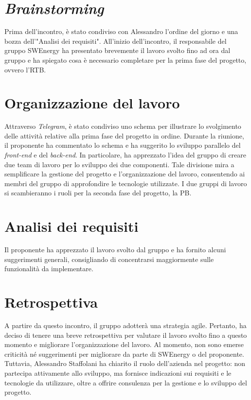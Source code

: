 \section{\textit{Brainstorming}}

Prima dell'incontro, è stato condiviso con Alessandro l'ordine del giorno e 
una bozza dell'"Analisi dei requisiti". All'inizio dell'incontro, il 
responsabile del gruppo SWEnergy ha presentato brevemente il lavoro svolto 
fino ad ora dal gruppo e ha spiegato cosa è necessario completare per la prima 
fase del progetto, ovvero l'RTB.

\section{Organizzazione del lavoro}

Attraverso \textit{Telegram}, è stato condiviso uno schema per illustrare lo 
svolgimento delle attività relative alla prima fase del progetto in ordine. 
Durante la riunione, il proponente ha commentato lo schema e ha suggerito lo 
sviluppo parallelo del \textit{front-end} e del \textit{back-end}. In 
particolare, ha apprezzato l'idea del gruppo di creare due team di lavoro per lo 
sviluppo dei due componenti. Tale divisione mira a semplificare la gestione del 
progetto e l'organizzazione del lavoro, consentendo ai membri del gruppo di 
approfondire le tecnologie utilizzate. I due gruppi di lavoro si scambieranno 
i ruoli per la seconda fase del progetto, la PB.

\section{Analisi dei requisiti}

Il proponente ha apprezzato il lavoro svolto dal gruppo e ha fornito alcuni 
suggerimenti generali, consigliando di concentrarsi maggiormente sulle 
funzionalità da implementare.

\section{Retrospettiva}

A partire da questo incontro, il gruppo adotterà una strategia agile. Pertanto, 
ha deciso di tenere una breve retrospettiva per valutare il lavoro svolto fino a 
questo momento e migliorare l'organizzazione del lavoro. Al momento, non sono 
emerse criticità né suggerimenti per migliorare da parte di SWEnergy o del 
proponente. Tuttavia, Alessandro Staffolani ha chiarito il ruolo dell'azienda nel 
progetto: non partecipa attivamente allo sviluppo, ma fornisce indicazioni sui 
requisiti e le tecnologie da utilizzare, oltre a offrire consulenza per la 
gestione e lo sviluppo del progetto.

